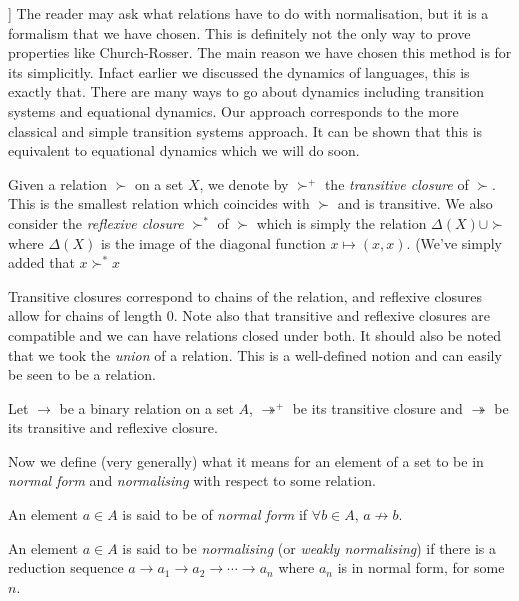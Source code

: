 \begin{remark}
[[CLEAN THIS UP]]
    The reader may ask what relations have to do with normalisation, but it is a formalism that we have chosen. This is definitely not the only way to prove properties like Church-Rosser. The main reason we have chosen this method is for its simplicitly. Infact earlier we discussed the dynamics of languages, this is exactly that. There are many ways to go about dynamics including transition systems and equational dynamics. Our approach corresponds to the more classical and simple transition systems approach. It can be shown that this is equivalent to equational dynamics which we will do soon.
\end{remark}

\begin{defin}
    Given a relation $\succ$ on a set $X$, we denote by $\succ^+$ the \emph{transitive closure} of $\succ$. This is the smallest relation which coincides with $\succ$ and is transitive. We also consider the \emph{reflexive closure} $\succ^*$ of $\succ$ which is simply the relation $\Delta(X)\cup \succ $ where $\Delta(X)$ is the image of the diagonal function $x \mapsto (x,x)$. (We've simply added that $x \succ^* x$
\end{defin}

\begin{remark}
    Transitive closures correspond to chains of the relation, and reflexive closures allow for chains of length $0$. Note also that transitive and reflexive closures are compatible and we can have relations closed under both. It should also be noted that we took the \emph{union} of a relation. This is a well-defined notion and can easily be seen to be a relation.
\end{remark}

Let $\to$ be a binary relation on a set $A$, $\twoheadrightarrow^+$ be its transitive closure and $\twoheadrightarrow$ be its transitive and reflexive closure.

Now we define (very generally) what it means for an element of a set to be in \emph{normal form} and \emph{normalising} with respect to some relation.

\begin{defin}
    An element $a \in A$ is said to be of \emph{normal form} if $\forall b \in A$, $a {\not \to} b$.
\end{defin}

\begin{defin}
    An element $a \in A$ is said to be \emph{normalising} (or \emph{weakly normalising}) if there is a reduction sequence $a \to a_1 \to a_2 \to \cdots \to a_n$ where $a_n$ is in normal form, for some $n$.
\end{defin}


